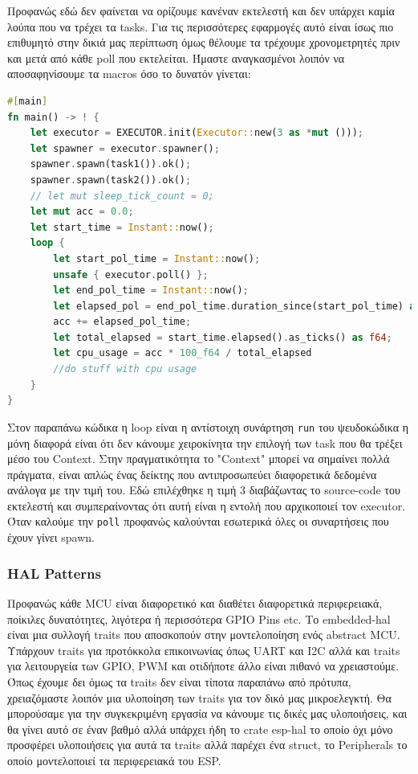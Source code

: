 Προφανώς εδώ δεν φαίνεται να ορίζουμε κανέναν εκτελεστή και δεν
υπάρχει καμία λούπα που να τρέχει τα tasks. Για τις περισσότερες
εφαρμογές αυτό είναι ίσως πιο επιθυμητό στην δικιά μας περίπτωση όμως
θέλουμε τα τρέχουμε χρονομετρητές πριν και μετά από κάθε poll που εκτελείται. Ήμαστε
αναγκασμένοι λοιπόν να αποσαφηνίσουμε τα macros όσο το δυνατόν γίνεται:

\begin{lstlisting}[language=Rust]
#[main]
fn main() -> ! {
    let executor = EXECUTOR.init(Executor::new(3 as *mut ()));
    let spawner = executor.spawner();
    spawner.spawn(task1()).ok();
    spawner.spawn(task2()).ok();
    // let mut sleep_tick_count = 0;
    let mut acc = 0.0;
    let start_time = Instant::now();
    loop {
        let start_pol_time = Instant::now();
        unsafe { executor.poll() };
        let end_pol_time = Instant::now();
        let elapsed_pol = end_pol_time.duration_since(start_pol_time) as f64;
        acc += elapsed_pol_time;
        let total_elapsed = start_time.elapsed().as_ticks() as f64;
        let cpu_usage = acc * 100_f64 / total_elapsed
        //do stuff with cpu usage
    }
}
\end{lstlisting}

Στον παραπάνω κώδικα η loop είναι η αντίστοιχη συνάρτηση \verb|run| του ψευδοκώδικα
η μόνη διαφορά είναι ότι δεν κάνουμε χειροκίνητα την επιλογή των task που θα τρέξει
μέσο του Context. Στην πραγματικότητα το "Context" μπορεί να σημαίνει πολλά πράγματα,
είναι απλώς ένας δείκτης που αντιπροσωπεύει διαφορετικά δεδομένα ανάλογα με την τιμή του.
Εδώ επιλέχθηκε η τιμή $3$ διαβάζωντας το source-code του εκτελεστή και συμπεραίνοντας
ότι αυτή είναι η εντολή που αρχικοποιεί τον executor. Όταν καλούμε την \verb|poll|
προφανώς καλούνται εσωτερικά όλες οι συναρτήσεις που έχουν γίνει spawn. 

\subsubsection{HAL Patterns}

Προφανώς κάθε MCU είναι διαφορετικό και διαθέτει διαφορετικά περιφερειακά,
ποίκιλες δυνατότητες,
λιγότερα ή περισσότερα GPIO Pins etc. Το embedded-hal είναι μια συλλογή
traits που αποσκοπούν στην μοντελοποίηση ενός abstract MCU. Υπάρχουν traits
για προτόκκολα επικοινωνίας όπως UART και I2C αλλά και traits για λειτουργεία
των GPIO, PWM και οτιδήποτε άλλο είναι πιθανό να χρειαστούμε.
Όπως έχουμε δει όμως τα traits δεν είναι τίποτα παραπάνω από πρότυπα, χρειαζόμαστε
λοιπόν μια υλοποίηση των traits για τον δικό μας μικροελεγκτή. Θα μπορούσαμε για την
συγκεκριμένη εργασία να κάνουμε τις δικές μας υλοποιήσεις, και θα γίνει αυτό σε έναν
βαθμό αλλά υπάρχει ήδη το crate esp-hal το οποίο όχι μόνο προσφέρει υλοποιήσεις για αυτά τα traits
αλλά παρέχει ένα struct, το Peripherals το οποίο μοντελοποιεί τα περιφερειακά του ESP.

